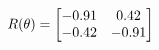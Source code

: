 \documentclass[preview]{standalone}
\begin{document}
\begin{align*}
\special{dvisvgm:raw <g id='unique000'>}R(\theta) = \begin{bmatrix}-0.91 & 0.42\\-0.42 & -0.91\end{bmatrix}\special{dvisvgm:raw </g>}
\end{align*}
\end{document}
